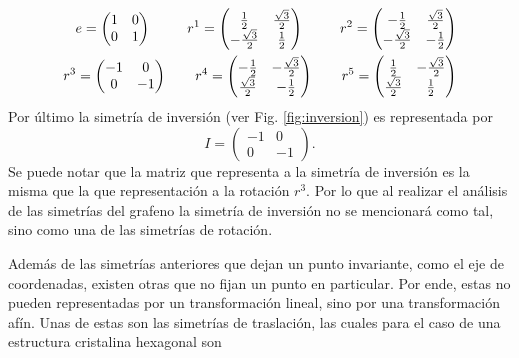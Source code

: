 \begin{align}
  \begin{split}
    e = \begin{pmatrix}
       1 & 0\\
       0 & 1 
      \end{pmatrix} \hspace{0.9cm} r^1 = \begin{pmatrix}
    \frac{1}{2} & \frac{\sqrt{3}}{2}\\
    -\frac{\sqrt{3}}{2} & \frac{1}{2}
  \end{pmatrix} \hspace{0.9cm} r^2 = \begin{pmatrix}
  -\frac{1}{2} & \frac{\sqrt{3}}{2} \\
  -\frac{\sqrt{3}}{2} & -\frac{1}{2}
  \end{pmatrix}\\
    r^3 = \begin{pmatrix}
      -1 & 0\\
 0 & -1
    \end{pmatrix} \hspace{0.7cm} r^4 = \begin{pmatrix}
    -\frac{1}{2} & -\frac{\sqrt{3}}{2} \\
    \frac{\sqrt{3}}{2} & -\frac{1}{2}
    \end{pmatrix} \hspace{0.7cm} r^5 = \begin{pmatrix}
  \frac{1}{2} & -\frac{\sqrt{3}}{2}\\
  \frac{\sqrt{3}}{2} & \frac{1}{2}
  \end{pmatrix} 
   \end{split}
\end{align}
Por último la simetría de inversión (ver Fig. \ref{fig:inversion}) es representada por
\begin{equation}
   I = \begin{pmatrix}
     -1 & 0\\
     0 & -1
   \end{pmatrix}.
\end{equation}
Se puede notar que la matriz que representa a la simetría de inversión es la misma que la que representación a la rotación $r^3$. Por lo que al realizar el análisis de las simetrías del grafeno la simetría de inversión no se mencionará como tal, sino como una de las simetrías de rotación.\par
Además de las simetrías anteriores que dejan un punto invariante, como el eje de coordenadas, existen otras que no fijan un punto en particular. Por ende, estas no pueden representadas por un transformación lineal, sino por una transformación afín. Unas de estas son las simetrías de traslación, las cuales para el caso de una estructura cristalina hexagonal son
